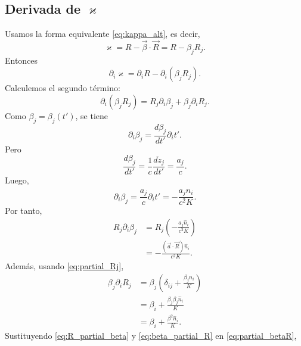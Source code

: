 \documentclass{article}
\numberwithin{equation}{section}
\newcommand{\bv}{\vec{\beta}}
\newcommand{\av}{\vec{a}}
\newcommand{\Rv}{\vec{R}}
\newcommand{\K}{K}
\begin{document}
\subsection{Derivada de $\varkappa$}

Usamos la forma equivalente \eqref{eq:kappa_alt}, es decir,
\begin{equation*}
  \varkappa=R-\bv\cdot\Rv=R-\beta_jR_j.
\end{equation*}
Entonces
\begin{equation}
  \partial_i\varkappa
  =\partial_iR-\partial_i(\beta_jR_j).
  \label{eq:partial_kappa_start}
\end{equation}
Calculemos el segundo t\'ermino:
\begin{equation}
  \partial_i(\beta_jR_j)
  =R_j\partial_i\beta_j+\beta_j\partial_iR_j.
  \label{eq:partial_betaR}
\end{equation}
Como $\beta_j=\beta_j(t')$, se tiene
\begin{equation*}
  \partial_i\beta_j
  =\frac{d\beta_j}{dt'}\partial_i t'.
\end{equation*}
Pero
\begin{equation*}
  \frac{d\beta_j}{dt'}
  =\frac{1}{c}\frac{d\dot{z}_j}{dt'}
  =\frac{a_j}{c}.
\end{equation*}
Luego,
\begin{equation}
  \partial_i\beta_j
  =\frac{a_j}{c}\partial_i t'
  =-\frac{a_j\hat{n}_i}{c^2\K}.
  \label{eq:partial_beta}
\end{equation}
Por tanto,
\begin{equation}
\begin{aligned}  R_j\partial_i\beta_j
  &=R_j\left(-\frac{a_j\hat{n}_i}{c^2\K}\right) \\
  &=-\frac{(\av\cdot\Rv)\hat{n}_i}{c^2\K}.
\end{aligned}
  \label{eq:R_partial_beta}
\end{equation}
Adem\'as, usando \eqref{eq:partial_Rj},
\begin{equation}
\begin{aligned}  \beta_j\partial_iR_j
  &=\beta_j\left(\delta_{ij}+\frac{\beta_j\hat{n}_i}{\K}\right) \\
  &=\beta_i+\frac{\beta_j\beta_j\hat{n}_i}{\K} \\
  &=\beta_i+\frac{\beta^2\hat{n}_i}{\K}.
\end{aligned}
  \label{eq:beta_partial_R}
\end{equation}
Sustituyendo \eqref{eq:R_partial_beta} y \eqref{eq:beta_partial_R} en
\eqref{eq:partial_betaR},
\end{document}
